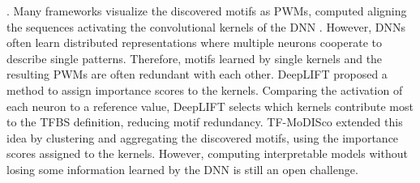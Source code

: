 \documentclass[a4paper, titlepage, openright]{book}
\begin{document}
\citep{park2020enhancing}. Many frameworks visualize the discovered motifs as PWMs, computed aligning the sequences activating the convolutional kernels of the DNN \citep{koo2020deep}. However, DNNs often learn distributed representations where multiple neurons cooperate to describe single patterns. Therefore, motifs learned by single kernels and the resulting PWMs are often redundant with each other. DeepLIFT \citep{shrikumar2017learning} proposed a method to assign importance scores to the kernels. Comparing the activation of each neuron to a reference value, DeepLIFT selects which kernels contribute most to the TFBS definition, reducing motif redundancy. TF-MoDISco \citep{avsec2021base} extended this idea by clustering and aggregating the discovered motifs, using the importance scores assigned to the kernels. However, computing interpretable models without losing some information learned by the DNN is still an open challenge.
\end{document}

